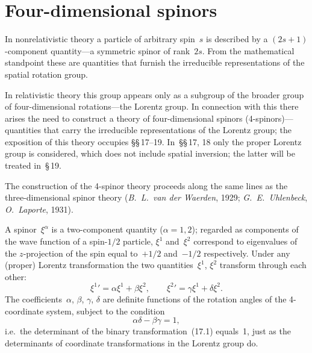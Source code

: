 \section{Four-dimensional spinors}

In nonrelativistic theory a particle of arbitrary spin~$s$ is described by a $(2s+1)$-component quantity---a symmetric spinor of rank~$2s$. From the mathematical standpoint these are quantities that furnish the irreducible representations of the spatial rotation group.

In relativistic theory this group appears only as a subgroup of the broader group of four-dimensional rotations---the Lorentz group. In connection with this there arises the need to construct a theory of four-dimensional spinors (4-spinors)---quantities that carry the irreducible representations of the Lorentz group; the exposition of this theory occupies \S\S\,17--19. In~\S\S\,17, 18 only the proper Lorentz group is considered, which does not include spatial inversion; the latter will be treated in~\S\,19.

The construction of the 4-spinor theory proceeds along the same lines as the three-dimensional spinor theory (\emph{B.~L.~van der Waerden}, 1929; \emph{G.~E.~Uhlenbeck}, \emph{O.~Laporte}, 1931).

A spinor~$\xi^\alpha$ is a two-component quantity ($\alpha = 1, 2$); regarded as components of the wave function of a spin-$1/2$ particle, $\xi^1$ and~$\xi^2$ correspond to eigenvalues of the $z$-projection of the spin equal to~$+1/2$ and~$-1/2$ respectively. Under any (proper) Lorentz transformation the two quantities~$\xi^1$, $\xi^2$ transform through each other:
\begin{equation}
{\xi^1}' = \alpha\xi^1 + \beta\xi^2, \qquad {\xi^2}' = \gamma\xi^1 + \delta\xi^2.
\tag{17.1}
\end{equation}
The coefficients~$\alpha$, $\beta$, $\gamma$, $\delta$ are definite functions of the rotation angles of the 4-coordinate system, subject to the condition
\begin{equation}
\alpha\delta - \beta\gamma = 1,
\tag{17.2}
\end{equation}
i.e.\ the determinant of the binary transformation~(17.1) equals~1, just as the determinants of coordinate transformations in the Lorentz group do.

